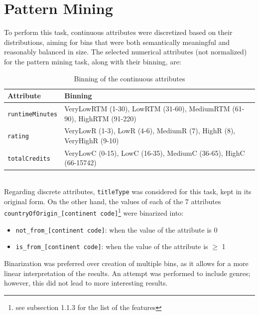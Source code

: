 \chapter{Pattern Mining}
\label{ch:capitolo2}
To perform this task, continuous attributes were discretized based on their distributions, 
aiming for bins that were both semantically meaningful and reasonably balanced in size. 
The selected numerical attributes (not normalized) for the pattern mining task, along with their binning, are:
\begin{table}[h]
\centering
\begin{tabular}{ll}
\toprule
\textbf{Attribute} & \textbf{Binning} \\
\midrule
\texttt{runtimeMinutes} & VeryLowRTM (1-30), LowRTM (31-60), MediumRTM (61-90), HighRTM (91-220) \\
\texttt{rating} & VeryLowR (1-3), LowR (4-6), MediumR (7), HighR (8), VeryHighR (9-10) \\
\texttt{totalCredits} & VeryLowC (0-15), LowC (16-35), MediumC (36-65), HighC (66-15742) \\
\bottomrule
\end{tabular}
\caption{Binning of the continuous attributes}
\end{table}\\
Regarding discrete attributes, \texttt{titleType} was considered for this task, kept in its original form. 
On the other hand, the values of each of the 7 attributes \texttt{countryOfOrigin\_[continent code]}\footnote{see subsection 1.1.3 for the list of the features} were binarized into:
\begin{itemize}
    \item \texttt{not\_from\_[continent code]}: when the value of the attribute is 0
    \item \texttt{is\_from\_[continent code]}: when the value of the attribute is $\geq$ 1
\end{itemize}
Binarization was preferred over creation of multiple bins, as it allows for a more linear interpretation of the results. 
An attempt was performed to include genres; however, this did not lead to more interesting results.

